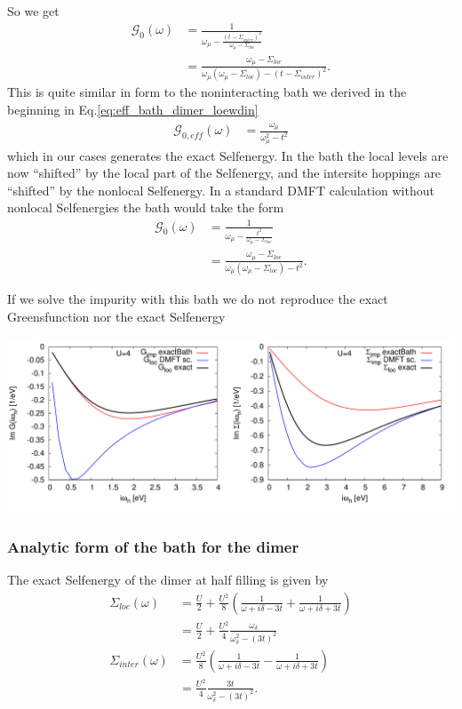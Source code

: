 \documentclass[12pt,a4paper]{scrartcl}
\numberwithin{equation}{section}
\begin{document}
So we get
\begin{align}
 \mathcal{G}_0(\omega) 
 &= \frac{1}{\omega_{\mu} - \frac{ (t-\Sigma_{inter})^2 }{\omega_{\mu}-\Sigma_{loc}} } \nonumber \\
 &= \frac{\omega_{\mu}-\Sigma_{loc} }{\omega_{\mu}(\omega_{\mu}-\Sigma_{loc}) -  (t-\Sigma_{inter})^2  } .
\end{align}
This is quite similar in form to the noninteracting bath we derived in the beginning in Eq.\eqref{eq:eff_bath_dimer_loewdin}
\begin{align}
 \mathcal{G}_{0,eff}(\omega)  &=\frac{\omega_{\mu}}{ \omega_{\mu}^2 - t^2 } 
\end{align}
which in our cases generates the exact Selfenergy. In the bath the local levels are now ``shifted''
by the local part of the Selfenergy, and the intersite hoppings are ``shifted'' by the nonlocal
Selfenergy.
In a standard DMFT calculation without nonlocal Selfenergies the bath would take the form
\begin{align}
 \mathcal{G}_0(\omega) 
 &= \frac{1}{\omega_{\mu} - \frac{ t^2 }{\omega_{\mu}-\Sigma_{loc}} } \nonumber \\
 &= \frac{\omega_{\mu}-\Sigma_{loc} }{\omega_{\mu}(\omega_{\mu}-\Sigma_{loc}) -  t^2  } .
\end{align}

If we solve the impurity with this bath we do not reproduce the exact Greensfunction nor the exact Selfenergy

\includegraphics[width=1\textwidth]{figs/reversebath/gimp_simp_dimer_exactbath.pdf}

\subsubsection{Analytic form of the bath for the dimer}
The exact Selfenergy of the dimer at half filling is given by
\begin{align}
 \Sigma_{loc}(\omega)
 &= \frac{U}{2} + \frac{U^2}{8}\left( \frac{1}{\omega+i\delta-3t} +  \frac{1}{\omega+i\delta+3t} \right) \nonumber\\
 &= \frac{U}{2} + \frac{U^2}{4} \frac{\omega_{\delta} }{ \omega^2_{\delta} -(3t)^2}  \\
 \Sigma_{inter}(\omega)
 &= \frac{U^2}{8} \left( \frac{1}{\omega+i\delta-3t} -  \frac{1}{\omega+i\delta+3t} \right)  \nonumber\\
    &= \frac{U^2}{4} \frac{ 3t }{ \omega^2_{\delta} -(3t)^2}.
\end{align}
\end{document}
